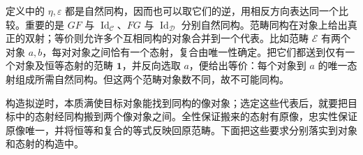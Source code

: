 定义中的 \(\eta,\varepsilon\) 都是自然同构，因而也可以取它们的逆，用相反方向表达同一个比较。重要的是 \(GF\) 与 \(\operatorname{Id}_{\mathcal C}\)、\(FG\) 与 \(\operatorname{Id}_{\mathcal D}\) 分别自然同构。范畴同构在对象上给出真正的双射；等价则允许多个互相同构的对象合并到一个代表。比如范畴 \(\mathcal E\) 有两个对象 \(a,b\)，每对对象之间恰有一个态射，复合由唯一性确定。把它们都送到仅有一个对象及恒等态射的范畴 \(\mathbf 1\)，并反向选取 \(a\)，便给出等价：每个对象到 \(a\) 的唯一态射组成所需自然同构。但这两个范畴对象数不同，故不可能同构。

\ProseParagraphBreak
构造拟逆时，本质满使目标对象能找到同构的像对象；选定这些代表后，就要把目标中的态射经同构搬到两个像对象之间。全性保证搬来的态射有原像，忠实性保证原像唯一，并将恒等和复合的等式反映回原范畴。下面把这些要求分别落实到对象和态射的构造中。

